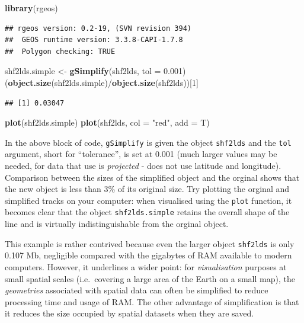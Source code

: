 \documentclass[]{article}
\newenvironment{Shaded}{}{}
\newcommand{\KeywordTok}[1]{\textcolor[rgb]{0.00,0.44,0.13}{\textbf{{#1}}}}
\newcommand{\DataTypeTok}[1]{\textcolor[rgb]{0.56,0.13,0.00}{{#1}}}
\newcommand{\DecValTok}[1]{\textcolor[rgb]{0.25,0.63,0.44}{{#1}}}
\newcommand{\FloatTok}[1]{\textcolor[rgb]{0.25,0.63,0.44}{{#1}}}
\newcommand{\StringTok}[1]{\textcolor[rgb]{0.25,0.44,0.63}{{#1}}}
\newcommand{\NormalTok}[1]{{#1}}
\begin{document}
\begin{Shaded}
\begin{Highlighting}[]
\KeywordTok{library}\NormalTok{(rgeos)}
\end{Highlighting}
\end{Shaded}
\begin{verbatim}
## rgeos version: 0.2-19, (SVN revision 394)
##  GEOS runtime version: 3.3.8-CAPI-1.7.8 
##  Polygon checking: TRUE
\end{verbatim}
\begin{Shaded}
\begin{Highlighting}[]
\NormalTok{shf2lds.simple <- }\KeywordTok{gSimplify}\NormalTok{(shf2lds, }\DataTypeTok{tol =} \FloatTok{0.001}\NormalTok{)}
\NormalTok{(}\KeywordTok{object.size}\NormalTok{(shf2lds.simple)/}\KeywordTok{object.size}\NormalTok{(shf2lds))[}\DecValTok{1}\NormalTok{]}
\end{Highlighting}
\end{Shaded}
\begin{verbatim}
## [1] 0.03047
\end{verbatim}
\begin{Shaded}
\begin{Highlighting}[]
\KeywordTok{plot}\NormalTok{(shf2lds.simple)}
\KeywordTok{plot}\NormalTok{(shf2lds, }\DataTypeTok{col =} \StringTok{"red"}\NormalTok{, }\DataTypeTok{add =} \NormalTok{T)}
\end{Highlighting}
\end{Shaded}
In the above block of code, \texttt{gSimplify} is given the object
\texttt{shf2lds} and the \texttt{tol} argument, short for ``tolerance'',
is set at 0.001 (much larger values may be needed, for data that use is
\emph{projected} - does not use latitude and longitude). Comparison
between the sizes of the simplified object and the orginal shows that
the new object is less than 3\% of its original size. Try plotting the
orginal and simplified tracks on your computer: when visualised using
the \texttt{plot} function, it becomes clear that the object
\texttt{shf2lds.simple} retains the overall shape of the line and is
virtually indistinguishable from the orginal object.

This example is rather contrived because even the larger object
\texttt{shf2lds} is only 0.107 Mb, negligible compared with the
gigabytes of RAM available to modern computers. However, it underlines a
wider point: for \emph{visualisation} purposes at small spatial scales
(i.e.~covering a large area of the Earth on a small map), the
\emph{geometries} associated with spatial data can often be simplified
to reduce processing time and usage of RAM. The other advantage of
simplification is that it reduces the size occupied by spatial datasets
when they are saved.
\end{document}
